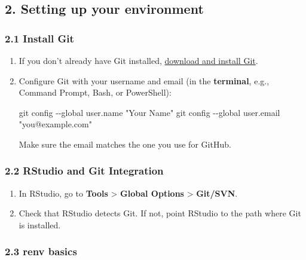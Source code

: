 \documentclass[
  letterpaper,
  DIV=11,
  numbers=noendperiod]{scrartcl}
\newenvironment{Shaded}{\begin{snugshade}}{\end{snugshade}}
\newcommand{\AttributeTok}[1]{\textcolor[rgb]{0.40,0.45,0.13}{#1}}
\newcommand{\FunctionTok}[1]{\textcolor[rgb]{0.28,0.35,0.67}{#1}}
\newcommand{\NormalTok}[1]{\textcolor[rgb]{0.00,0.23,0.31}{#1}}
\newcommand{\StringTok}[1]{\textcolor[rgb]{0.13,0.47,0.30}{#1}}
\providecommand{\tightlist}{%
  \setlength{\itemsep}{0pt}\setlength{\parskip}{0pt}}\usepackage{longtable,booktabs,array}
\begin{document}
\subsection{2. Setting up your
environment}\label{setting-up-your-environment}

\subsubsection{2.1 Install Git}\label{install-git}

\begin{enumerate}
\def\labelenumi{\arabic{enumi}.}
\item
  If you don't already have Git installed,
  \href{https://git-scm.com/downloads}{download and install Git}.
\item
  Configure Git with your username and email (in the \textbf{terminal},
  e.g., Command Prompt, Bash, or PowerShell):

\begin{Shaded}
\begin{Highlighting}[]
\FunctionTok{git}\NormalTok{ config }\AttributeTok{{-}{-}global}\NormalTok{ user.name }\StringTok{"Your Name"}
\FunctionTok{git}\NormalTok{ config }\AttributeTok{{-}{-}global}\NormalTok{ user.email }\StringTok{"you@example.com"}
\end{Highlighting}
\end{Shaded}

  Make sure the email matches the one you use for GitHub.
\end{enumerate}

\subsubsection{2.2 RStudio and Git
Integration}\label{rstudio-and-git-integration}

\begin{enumerate}
\def\labelenumi{\arabic{enumi}.}
\tightlist
\item
  In RStudio, go to \textbf{Tools} \textgreater{} \textbf{Global
  Options} \textgreater{} \textbf{Git/SVN}.
\item
  Check that RStudio detects Git. If not, point RStudio to the path
  where Git is installed.
\end{enumerate}

\subsubsection{2.3 renv basics}\label{renv-basics}
\end{document}
